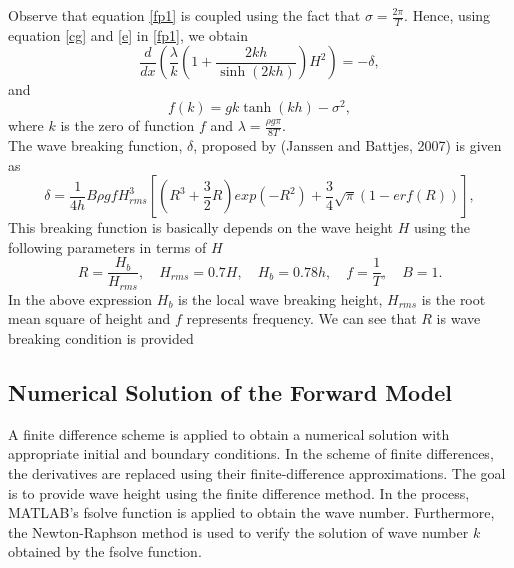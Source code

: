 \noindent Observe that equation \ref{fp1} is coupled using the fact that $\sigma=\frac{2\pi}{T}$. Hence, using equation \ref{cg} and \ref{e} in \ref{fp1}, we obtain
\begin{equation}
\label{fpdelta}
\frac{d}{dx}\left( \frac{\lambda}{k}\left(1+\frac{2kh}{\sinh(2kh)}\right)H^2 \right)=-\delta,
\end{equation}  
and 
\begin{equation}
\label{fk}
f(k) = gk\tanh(kh)-\sigma^2,
\end{equation}
where $k$ is the zero of function $f$ and $\lambda=\frac{\rho g \pi}{8T}$.\\

The wave breaking function, $\delta$, proposed by (Janssen and Battjes, 2007) is given as
\begin{equation}
\delta = \frac{1}{4h}B\rho g f H_{rms}^3\left[(R^3+\frac{3}{2}R)exp(-R^2)+\frac{3}{4}\sqrt{\pi}(1-erf(R))\right],
\end{equation}
This breaking function is basically depends on the wave height ${H}$ using the following parameters in terms of ${H}$\\
$$R=\frac{H_b}{H_{rms}}, \quad H_{rms} = 0.7H,\quad H_b=0.78h,\quad f=\frac{1}{T},\quad B=1.$$
In the above expression ${H_{b}}$ is the local wave breaking height, ${H_{rms}}$ is the root mean square of height and ${f}$ represents frequency. We can see that ${R}$ is wave breaking condition is provided 

\subsection{Numerical Solution of the Forward Model}
A finite difference scheme is applied to obtain a numerical solution with appropriate initial and boundary conditions. In the scheme of finite differences, the derivatives are replaced using their finite-difference approximations. The goal is to provide wave height using the finite difference method. In the process, MATLAB's fsolve function is applied to obtain the wave number. Furthermore, the Newton-Raphson method is used to verify the solution of wave number $k$ obtained by the fsolve function.

